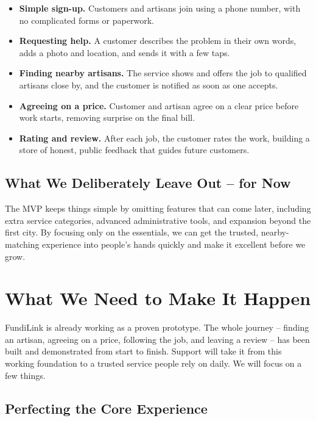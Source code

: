 \documentclass[11pt,a4paper]{article}
\begin{document}
\begin{itemize}[leftmargin=1.5em, label={--}]
    \item \textbf{Simple sign-up.} Customers and artisans join using a phone number, with no
          complicated forms or paperwork.
    \item \textbf{Requesting help.} A customer describes the problem in their own words, adds
          a photo and location, and sends it with a few taps.
    \item \textbf{Finding nearby artisans.} The service shows and offers the job to qualified
          artisans close by, and the customer is notified as soon as one accepts.
    \item \textbf{Agreeing on a price.} Customer and artisan agree on a clear price before
          work starts, removing surprise on the final bill.
    \item \textbf{Rating and review.} After each job, the customer rates the work, building a
          store of honest, public feedback that guides future customers.
\end{itemize}

\subsection{What We Deliberately Leave Out -- for Now}

The MVP keeps things simple by omitting features that can come later, including extra service
categories, advanced administrative tools, and expansion beyond the first city. By focusing
only on the essentials, we can get the trusted, nearby-matching experience into people's hands
quickly and make it excellent before we grow.

\section{What We Need to Make It Happen}

FundiLink is already working as a proven prototype. The whole journey -- finding an artisan,
agreeing on a price, following the job, and leaving a review -- has been built and demonstrated
from start to finish. Support will take it from this working foundation to a trusted service
people rely on daily. We will focus on a few things.

\subsection{Perfecting the Core Experience}
\end{document}
